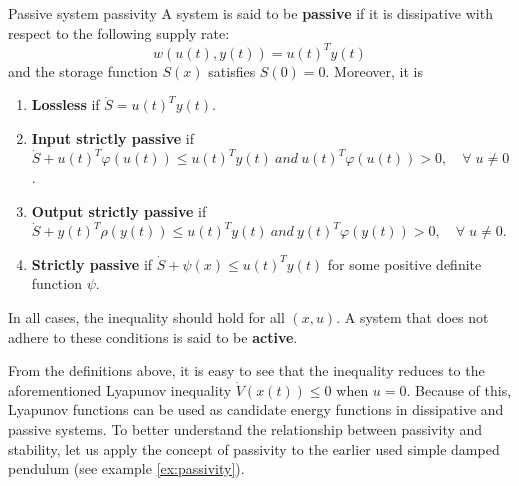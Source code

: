 \begin{definition}[list text=Passive system,after pre=\footnotetext{Definition 2.7 of \cite{baoProcessControlPassive2007} was combined with a slightly modified version of definition 5.3 of \cite{khalilNonlinearControl2015}.}]{Passive system \cite{khalilNonlinearControl2015, baoProcessControlPassive2007}\footnotemark}{passivity}
  A system is said to be \textbf{passive} if it is dissipative with respect to the following supply rate:
  \begin{equation}
    w \left(u \left(t\right), y \left( t \right)\right)={ u \left( t \right)}^T y \left( t \right)
  \end{equation}
  and the storage function $S \left( x \right)$ satisfies $S \left( 0 \right)= 0$. Moreover, it is
  \begin{enumerate}
    \item \textbf{Lossless} if $\dot{ S }={ u \left( t \right)}^T y \left( t \right)$.
    \item \textbf{Input strictly passive} if $\dot{S} + {u \left(t \right)}^T \varphi \left(u \left(t \right)\right) \le {u \left(t \right)}^T y \left(t \right) \ and \ {u \left( t \right)}^T \varphi \left(u \left( t \right)\right) > 0, \quad \forall \; u \neq 0$.
    \item \textbf{Output strictly passive} if $\dot{S} + {y \left(t \right)}^T \rho \left(y \left(t \right)\right) \le {u \left(t \right)}^T y \left(t \right) \ and \ {y \left( t \right)}^T \varphi \left(y \left(t \right)\right) > 0, \quad \forall \; u \neq 0$.
    \item \textbf{Strictly passive} if $\dot{S} + \psi \left(x \right) \le {u \left(t \right)}^T y \left(t \right)$ for some positive definite function $\psi$.
  \end{enumerate}
  In all cases, the inequality should hold for all $\left(x, u\right)$. A system that does not adhere to these conditions is said to be \textbf{active}.
\end{definition}

From the definitions above, it is easy to see that the inequality reduces to the aforementioned Lyapunov inequality $\dot{ V }\left( x \left( t \right)\right)\le 0$ when $u = 0$. Because of this, Lyapunov functions can be used as candidate energy functions in dissipative and passive systems. To better understand the relationship between passivity and stability, let us apply the concept of passivity to the earlier used simple damped pendulum (see example \ref{ex:passivity}).

